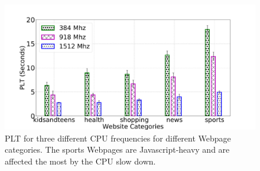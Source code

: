 \begin{figure}[t]
  \centering
  \includegraphics[width=\linewidth]{sections/device-work/sites-effect}
  \caption{PLT for three different CPU frequencies for different Webpage categories. The sports Webpages are Javascript-heavy and are affected the most by the CPU 
  slow down.    }
  \vspace{-0.2in}
  \label{fig:sites-effect}
\end{figure}


